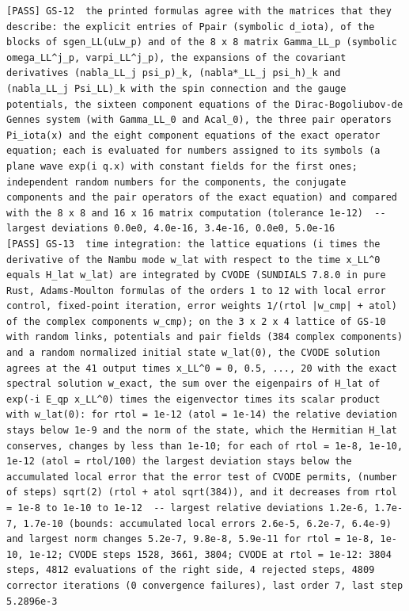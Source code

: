 \documentclass[
  10pt,
]{article}
\begin{document}
\begin{verbatim}
[PASS] GS-12  the printed formulas agree with the matrices that they describe: the explicit entries of Ppair (symbolic d_iota), of the blocks of sgen_LL(uLw_p) and of the 8 x 8 matrix Gamma_LL_p (symbolic omega_LL^j_p, varpi_LL^j_p), the expansions of the covariant derivatives (nabla_LL_j psi_p)_k, (nabla*_LL_j psi_h)_k and (nabla_LL_j Psi_LL)_k with the spin connection and the gauge potentials, the sixteen component equations of the Dirac-Bogoliubov-de Gennes system (with Gamma_LL_0 and Acal_0), the three pair operators Pi_iota(x) and the eight component equations of the exact operator equation; each is evaluated for numbers assigned to its symbols (a plane wave exp(i q.x) with constant fields for the first ones; independent random numbers for the components, the conjugate components and the pair operators of the exact equation) and compared with the 8 x 8 and 16 x 16 matrix computation (tolerance 1e-12)  -- largest deviations 0.0e0, 4.0e-16, 3.4e-16, 0.0e0, 5.0e-16
[PASS] GS-13  time integration: the lattice equations (i times the derivative of the Nambu mode w_lat with respect to the time x_LL^0 equals H_lat w_lat) are integrated by CVODE (SUNDIALS 7.8.0 in pure Rust, Adams-Moulton formulas of the orders 1 to 12 with local error control, fixed-point iteration, error weights 1/(rtol |w_cmp| + atol) of the complex components w_cmp); on the 3 x 2 x 4 lattice of GS-10 with random links, potentials and pair fields (384 complex components) and a random normalized initial state w_lat(0), the CVODE solution agrees at the 41 output times x_LL^0 = 0, 0.5, ..., 20 with the exact spectral solution w_exact, the sum over the eigenpairs of H_lat of exp(-i E_qp x_LL^0) times the eigenvector times its scalar product with w_lat(0): for rtol = 1e-12 (atol = 1e-14) the relative deviation stays below 1e-9 and the norm of the state, which the Hermitian H_lat conserves, changes by less than 1e-10; for each of rtol = 1e-8, 1e-10, 1e-12 (atol = rtol/100) the largest deviation stays below the accumulated local error that the error test of CVODE permits, (number of steps) sqrt(2) (rtol + atol sqrt(384)), and it decreases from rtol = 1e-8 to 1e-10 to 1e-12  -- largest relative deviations 1.2e-6, 1.7e-7, 1.7e-10 (bounds: accumulated local errors 2.6e-5, 6.2e-7, 6.4e-9) and largest norm changes 5.2e-7, 9.8e-8, 5.9e-11 for rtol = 1e-8, 1e-10, 1e-12; CVODE steps 1528, 3661, 3804; CVODE at rtol = 1e-12: 3804 steps, 4812 evaluations of the right side, 4 rejected steps, 4809 corrector iterations (0 convergence failures), last order 7, last step 5.2896e-3

\end{verbatim}
\end{document}
